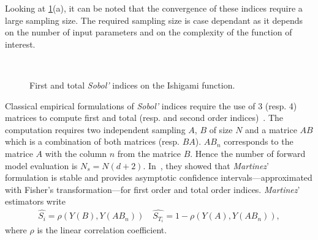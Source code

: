 Looking at \cref{fig:sobol}(a), it can be noted that the convergence of these indices require a large sampling size. The required sampling size is case dependant as it depends on the number of input parameters and on the complexity of the function of interest.

\begin{figure}[!h]               
\centering
{}
 ~       
\caption{First and total \textit{Sobol'} indices on the Ishigami function.}
\label{fig:sobol}
\end{figure}
Classical empirical formulations of \emph{Sobol'} indices require the use of 3 (resp. 4) matrices to compute first and total (resp. and second order indices)~\cite{Saltelli2010}. The computation requires two independent sampling $A$, $B$ of size $N$ and a matrice $AB$ which is a combination of both matrices (resp. $BA$). $AB_{n}$ corresponds to the matrice $A$ with the column $n$ from the matrice $B$. Hence the number of forward model evaluation is $N_s = N(d + 2)$. In~\citep{baudin2016}, they showed that \textit{Martinez}' formulation is stable and provides asymptotic confidence intervals---approximated with Fisher's transformation---for first order and total order indices. \textit{Martinez}' estimators write
\begin{align}
\hat{S_i} = \rho (Y(B), Y(AB_{n})) \quad \hat{S_{T_i}} = 1 - \rho (Y(A), Y(AB_n)),
\end{align}
\noindent where $\rho$ is the linear correlation coefficient.

